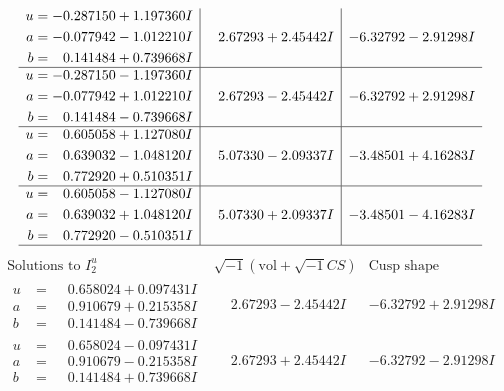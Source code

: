 \documentclass[1p]{elsarticle_modified}
\theoremstyle{definition}
\newcommand{\I}{\sqrt{-1}}
\begin{document}
$$\begin{array}{c|c|c}
\begin{aligned}
u &= -0.287150 + 1.197360 I \\
a &= -0.077942 - 1.012210 I \\
b &= \phantom{-}0.141484 + 0.739668 I\end{aligned}
 & \phantom{-}2.67293 + 2.45442 I & -6.32792 - 2.91298 I \\ \hline\begin{aligned}
u &= -0.287150 - 1.197360 I \\
a &= -0.077942 + 1.012210 I \\
b &= \phantom{-}0.141484 - 0.739668 I\end{aligned}
 & \phantom{-}2.67293 - 2.45442 I & -6.32792 + 2.91298 I \\ \hline\begin{aligned}
u &= \phantom{-}0.605058 + 1.127080 I \\
a &= \phantom{-}0.639032 - 1.048120 I \\
b &= \phantom{-}0.772920 + 0.510351 I\end{aligned}
 & \phantom{-}5.07330 - 2.09337 I & -3.48501 + 4.16283 I \\ \hline\begin{aligned}
u &= \phantom{-}0.605058 - 1.127080 I \\
a &= \phantom{-}0.639032 + 1.048120 I \\
b &= \phantom{-}0.772920 - 0.510351 I\end{aligned}
 & \phantom{-}5.07330 + 2.09337 I & -3.48501 - 4.16283 I\\
 \hline 
 \end{array}$$\newpage$$\begin{array}{c|c|c}  
\text{Solutions to }I^u_{2}& \I (\text{vol} + \sqrt{-1}CS) & \text{Cusp shape}\\
 \hline 
\begin{aligned}
u &= \phantom{-}0.658024 + 0.097431 I \\
a &= \phantom{-}0.910679 + 0.215358 I \\
b &= \phantom{-}0.141484 - 0.739668 I\end{aligned}
 & \phantom{-}2.67293 - 2.45442 I & -6.32792 + 2.91298 I \\ \hline\begin{aligned}
u &= \phantom{-}0.658024 - 0.097431 I \\
a &= \phantom{-}0.910679 - 0.215358 I \\
b &= \phantom{-}0.141484 + 0.739668 I\end{aligned}
 & \phantom{-}2.67293 + 2.45442 I & -6.32792 - 2.91298 I \\ \hline\begin{aligned}

\end{aligned}
\end{array}$$
\end{document}

